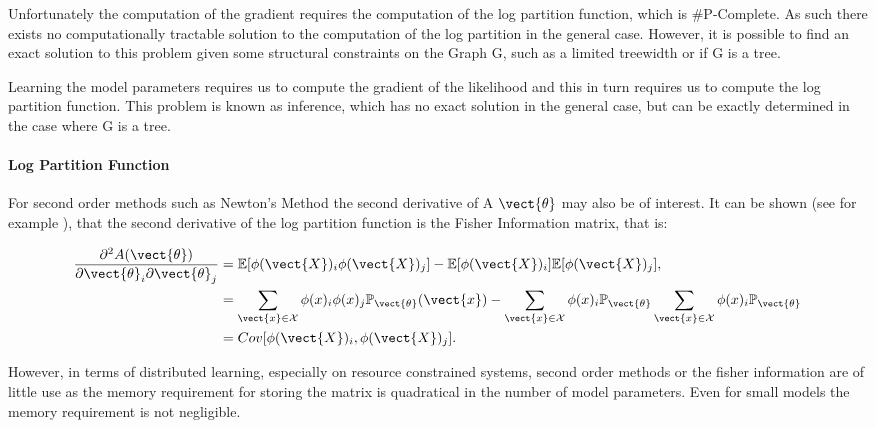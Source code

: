     Unfortunately the computation of the gradient requires the computation of the log partition function, which is \#P-Complete.
    As such there exists no computationally tractable solution to the computation of the log partition in the general case.
    However, it is possible to find an exact solution to this problem given some structural constraints on the Graph G, such as a limited treewidth or if G is a tree.

    Learning the model parameters requires us to compute the gradient of the likelihood and this in turn requires us to compute the log partition function. 
    This problem is known as inference, which has no exact solution in the general case, but can be exactly determined in the case where G is a tree.

    \paragraph*{Log Partition Function}
    For second order methods such as Newton's Method the second derivative of A \wrt $\vect{\theta}$ may also be of interest.
    It can be shown (see for example \cite{piatkowski2018exponential}), that the second derivative of the log partition function is the Fisher Information matrix, that is:

    \begin{equation}
        \label{eq:sparsefish}
        \begin{split}
        \frac{\partial^2 A(\vect{\theta})}{\partial \vect{\theta}_i \partial \vect{\theta}_j} &= \mathbb{E}[\phi(\vect{X})_i \phi(\vect{X})_j] - \mathbb{E}[\phi(\vect{X})_i] \mathbb{E}[\phi(\vect{X})_j], \\
        &= \sum_{\vect{x} \in \mathcal{X}} \phi(x)_i \phi(x)_j \mathbb{P}_{\vect{\theta}}(\vect{x}) - \sum_{\vect{x} \in \mathcal{X}} \phi(x)_i \mathbb{P}_{\vect{\theta}} \sum_{\vect{x} \in \mathcal{X}} \phi(x)_i  \mathbb{P}_{\vect{\theta}} \\
        &= Cov[\phi(\vect{X})_i, \phi(\vect{X})_j].
        \end{split}
    \end{equation}

    However, in terms of distributed learning, especially on resource constrained systems, second order methods or the fisher information are of little use as the memory requirement for storing the matrix is quadratical in the number of model parameters.
    Even for small models the memory requirement is not negligible.

